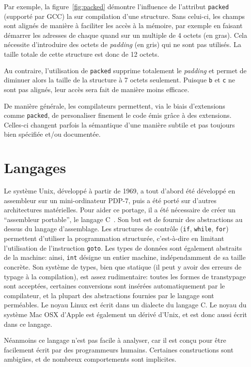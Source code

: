 Par exemple, la figure~\ref{fig:packed} démontre l'influence de l'attribut
\texttt{packed} (supporté par GCC) la sur compilation d'une structure. Sans
celui-ci, les champs sont alignés de manière à faciliter les accès à la mémoire,
par exemple en faisant démarrer les adresses de chaque quand sur un multiple de
4 octets (en gras). Cela nécessite d'introduire des octets de \emph{padding} (en
gris) qui ne sont pas utilisés. La taille totale de cette structure est donc de
12 octets.

Au contraire, l'utilisation de \texttt{packed} supprime totalement le
\emph{padding} et permet de diminuer alors la taille de la structure à 7 octets
seulement. Puisque \texttt{b} et \texttt{c} ne sont pas alignés, leur accès sera
fait de manière moins efficace.

De manière générale, les compilateurs permettent, via le biais d'extensions
comme \texttt{packed}, de personaliser finement le code émis grâce à des
extensions. Celles-ci changent parfois la sémantique d'une manière subtile et
pas toujours bien spécifiée et/ou documentée.

\section{Langages}

Le système Unix, développé à partir de 1969, a tout d'abord été développé en
assembleur sur un mini-ordinateur PDP-7, puis a été porté sur d'autres
architectures matérielles. Pour aider ce portage, il a été nécessaire de créer
un \enquote{assembleur portable}, le langage C~\cite{KandR,AnsiC}. Son but est
de fournir des abstractions au dessus du langage d'assemblage. Les structures de
contrôle (\texttt{if}, \texttt{while}, \texttt{for}) permettent d'utiliser la
programmation structurée, c'est-à-dire en limitant l'utilisation de
l'instruction \texttt{goto}. Les types de données sont également abstraits de la
machine: ainsi, \texttt{int} désigne un entier machine, indépendamment de sa
taille concrète. Son système de types, bien que statique (il peut y avoir des
erreurs de typage à la compilation), est assez rudimentaire: toutes les formes
de transtypage sont acceptées, certaines conversions sont insérées
automatiquement par le compilateur, et la plupart des abstractions fournies par
le langage sont perméables. Le noyau Linux est écrit dans un dialecte du langage
C. Le noyau du système Mac OSX d'Apple est également un dérivé d'Unix, et est
donc aussi écrit dans ce langage.

Néanmoins ce langage n'est pas facile à analyser, car il est conçu pour être
facilement écrit par des programmeurs humains. Certaines constructions sont
ambigües, et de nombreux comportements sont implicites.

